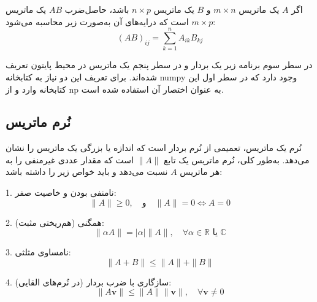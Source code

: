 \begin{definition}
	اگر $A$ یک ماتریس $m \times n$ و $B$ یک ماتریس $n \times p$ باشد، حاصل‌ضرب $AB$ یک ماتریس $m \times p$ است که درایه‌های آن به‌صورت زیر محاسبه می‌شود:
	\[ (AB)_{ij} = \sum_{k=1}^{n} A_{ik} B_{kj} \]
	
\end{definition}

\begin{code}
	در سطر سوم برنامه زیر یک بردار و در سطر پنجم یک ماتریس در محیط پایتون تعریف شده‌اند. برای تعریف این دو نیاز به کتابخانه numpy وجود دارد که در سطر اول این کتابخانه وارد و از np به عنوان اختصار آن استفاده شده است.
	\begin{latin}
		  
	\end{latin}
\end{code}
\subsection{نُرم ماتریس}
نُرم یک ماتریس، تعمیمی از نُرم بردار است که اندازه یا بزرگی یک ماتریس را نشان می‌دهد. به‌طور کلی، نُرم ماتریس یک تابع $\|A\|$ است که مقدار عددی غیرمنفی را به هر ماتریس $A$ نسبت می‌دهد و باید خواص زیر را داشته باشد:
\begin{nokteh}
1. نامنفی بودن و خاصیت صفر:
\[
\|A\| \geq 0, \quad \text{و} \quad \|A\| = 0 \iff A = 0
\]

2. همگنی (هم‌ریختی مثبت):
\[
\|\alpha A\| = |\alpha| \|A\|, \quad \forall \alpha \in \mathbb{R} \text{ یا } \mathbb{C}
\]

3. نامساوی مثلثی:
\[
\|A + B\| \leq \|A\| + \|B\|
\]

4. سازگاری با ضرب بردار (در نُرم‌های القایی):
\[
\|A\mathbf{v}\| \leq \|A\| \|\mathbf{v}\|, \quad \forall \mathbf{v} \neq 0
\]
\end{nokteh}
